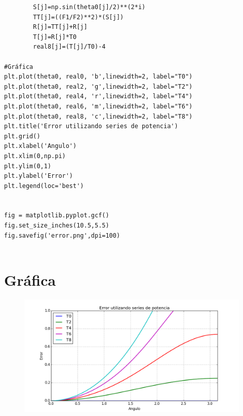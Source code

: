 \documentclass[12pt]{article}
\begin{document}
\begin{verbatim}
        S[j]=np.sin(theta0[j]/2)**(2*i)
        TT[j]=((F1/F2)**2)*(S[j])
        R[j]=TT[j]+R[j]
        T[j]=R[j]*T0
        real8[j]=(T[j]/T0)-4

#Gráfica
plt.plot(theta0, real0, 'b',linewidth=2, label="T0")
plt.plot(theta0, real2, 'g',linewidth=2, label="T2")
plt.plot(theta0, real4, 'r',linewidth=2, label="T4")
plt.plot(theta0, real6, 'm',linewidth=2, label="T6")
plt.plot(theta0, real8, 'c',linewidth=2, label="T8")
plt.title('Error utilizando series de potencia')
plt.grid()
plt.xlabel('Angulo')
plt.xlim(0,np.pi)
plt.ylim(0,1)
plt.ylabel('Error')
plt.legend(loc='best')


fig = matplotlib.pyplot.gcf()
fig.set_size_inches(10.5,5.5)
fig.savefig('error.png',dpi=100)


\end{verbatim}
\section{Gráfica}
\begin{figure}[H]
\centering
\includegraphics[scale=.7]{err}
\end{figure}
\end{document}
